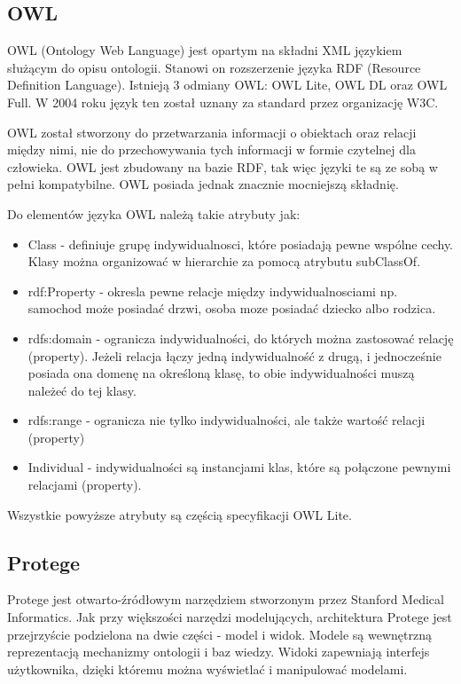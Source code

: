 \subsection{OWL}
\label{sec:owl}

OWL (Ontology Web Language) jest opartym na składni XML językiem służącym do opisu ontologii. Stanowi on rozszerzenie języka RDF (Resource Definition Language). Istnieją 3 odmiany OWL: OWL Lite, OWL DL oraz OWL Full. W 2004 roku język ten został uznany za standard przez organizację W3C.

OWL został stworzony do przetwarzania informacji o obiektach oraz relacji między nimi, nie do przechowywania tych informacji w formie czytelnej dla człowieka. OWL jest zbudowany na bazie RDF, tak więc języki te są ze sobą w pełni kompatybilne. OWL posiada jednak znacznie mocniejszą składnię.

Do elementów języka OWL należą takie atrybuty jak:

\begin{itemize}

\item Class - definiuje grupę indywidualnosci, które posiadają pewne wspólne cechy. Klasy można organizować w hierarchie za pomocą atrybutu subClassOf.


\item rdf:Property - okresla pewne relacje między indywidualnosciami np. samochod może posiadać drzwi, osoba moze posiadać dziecko albo rodzica.

\item rdfs:domain - ogranicza indywidualności, do których można zastosować relację (property). Jeżeli relacja łączy jedną indywidualność z drugą, i jednocześnie posiada ona domenę na określoną klasę, to obie indywidualności muszą należeć do tej klasy.

\item rdfs:range - ogranicza nie tylko indywidualności, ale także wartość relacji (property)

\item Individual - indywidualności są instancjami klas, które są połączone pewnymi relacjami (property).

\end{itemize}

Wszystkie powyższe atrybuty są częścią specyfikacji OWL Lite.

\subsection{Protege}
\label{sec:protege}
Protege jest otwarto-źródłowym narzędziem stworzonym przez Stanford Medical Informatics. Jak przy większości narzędzi modelujących, architektura Protege jest przejrzyście podzielona na dwie części - model i widok. Modele są wewnętrzną reprezentacją mechanizmy ontologii i baz wiedzy. Widoki zapewniają interfejs użytkownika, dzięki któremu można wyświetlać i manipulować modelami.

